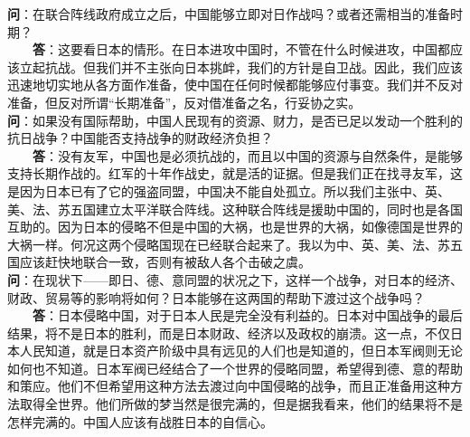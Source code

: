 \documentclass[cn,11pt,chinese]{elegantbook}
\begin{document}
\textbf{问}：在联合阵线政府成立之后，中国能够立即对日作战吗？或者还需相当的准备时期？\\
　　\textbf{答}：这要看日本的情形。在日本进攻中国时，不管在什么时候进攻，中国都应该立起抗战。但我们并不主张向日本挑衅，我们的方针是自卫战。因此，我们应该迅速地切实地从各方面作准备，使中国在任何时候都能够应付事变。我们并不反对准备，但反对所谓“长期准备”，反对借准备之名，行妥协之实。\\

\textbf{问}：如果没有国际帮助，中国人民现有的资源、财力，是否已足以发动一个胜利的抗日战争？中国能否支持战争的财政经济负担？\\
　　\textbf{答}：没有友军，中国也是必须抗战的，而且以中国的资源与自然条件，是能够支持长期作战的。红军的十年作战史，就是活的证据。但是我们正在找寻友军，这是因为日本已有了它的强盗同盟，中国决不能自处孤立。所以我们主张中、英、美、法、苏五国建立太平洋联合阵线。这种联合阵线是援助中国的，同时也是各国互助的。因为日本的侵略不但是中国的大祸，也是世界的大祸，如像德国是世界的大祸一样。何况这两个侵略国现在已经联合起来了。我以为中、英、美、法、苏五国应该赶快地联合一致，否则有被敌人各个击破之虞。\\


\textbf{问}：在现状下——即日、德、意同盟的状况之下，这样一个战争，对日本的经济、财政、贸易等的影响将如何？日本能够在这两国的帮助下渡过这个战争吗？\\
　　\textbf{答}：日本侵略中国，对于日本人民是完全没有利益的。日本对中国战争的最后结果，将不是日本的胜利，而是日本财政、经济以及政权的崩溃。这一点，不仅日本人民知道，就是日本资产阶级中具有远见的人们也是知道的，但日本军阀则无论如何也不知道。日本军阀已经结合了一个世界的侵略同盟，希望得到德、意的帮助和策应。他们不但希望用这种方法去渡过向中国侵略的战争，而且正准备用这种方法取得全世界。他们所做的梦当然是很完满的，但是据我看来，他们的结果将不是怎样完满的。中国人应该有战胜日本的自信心。\\
\end{document}
